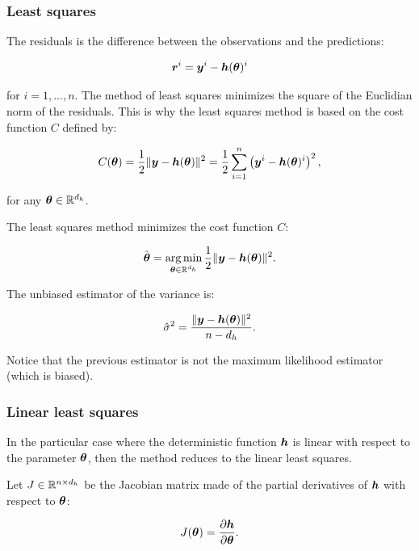 \documentclass{beamer}
\begin{document}

\begin{frame}
\frametitle{Least squares}

The residuals is the difference between the observations and the
predictions:

$$
       \boldsymbol{r}^i = \boldsymbol{y}^i - \boldsymbol{h}(\boldsymbol{\theta})^i
$$

for $i=1,...,n$. The method of least squares minimizes the square
of the Euclidian norm of the residuals. This is why the least squares
method is based on the cost function $C$ defined by:

$$
       C(\boldsymbol{\theta}) = \frac{1}{2} \|\boldsymbol{y} - \boldsymbol{h}(\boldsymbol{\theta})\|^2 = \frac{1}{2} \sum_{i=1}^n \left( \boldsymbol{y}^i - \boldsymbol{h}(\boldsymbol{\theta})^i \right)^2,
$$

for any $\boldsymbol{\theta} \in \mathbb{R}^{d_h}$.


\end{frame}


\begin{frame}
The least squares method minimizes the cost function $C$:

$$
\hat{\boldsymbol{\theta}} 
= \operatorname*{arg\,min}_{\boldsymbol{\theta} \in \mathbb{R}^{d_h}} \frac{1}{2} \|\boldsymbol{y} - \boldsymbol{h}(\boldsymbol{\theta})\|^2.
$$

The unbiased estimator of the variance is:

$$
       \hat{\sigma}^2 = \frac{\|\boldsymbol{y} - \boldsymbol{h}(\boldsymbol{\theta})\|^2}{n - d_h}.
$$

Notice that the previous estimator is not the maximum likelihood
estimator (which is biased).
\end{frame}


\begin{frame}
\frametitle{Linear least squares}

In the particular case where the deterministic function $\boldsymbol{h}$
is linear with respect to the parameter $\boldsymbol{\theta}$, then the
method reduces to the linear least squares. 

Let $J \in \mathbb{R}^{n \times d_h}$ be the Jacobian matrix made of the
partial derivatives of $\boldsymbol{h}$ with respect to
$\boldsymbol{\theta}$:

$$
       J(\boldsymbol{\theta}) = \frac{\partial \boldsymbol{h}}{\partial \boldsymbol{\theta}}.
$$

\end{frame}
\end{document}
